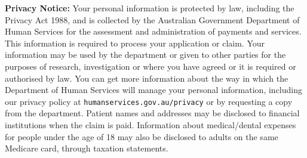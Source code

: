 \documentclass[12pt]{article}
\begin{document}
\begin{spacing}{0.3}
{{\bf Privacy Notice:} Your personal information is protected by law, including the Privacy Act 1988, and is collected by the Australian Government Department of Human Services for the assessment and administration of payments and services. This information is required to process your application or claim. 
Your information may be used by the department or given to other parties for the purposes of research, investigation or where you have agreed or it is required or authorised by law. 
You can get more information about the way in which the Department of Human Services will manage your personal information, including our privacy policy at \texttt{humanservices.gov.au/privacy} or by requesting a copy from the department.
Patient names and addresses may be disclosed to financial institutions when the claim is paid. Information about medical/dental expenses for people under the age of 18 may also be disclosed to adults on the same Medicare card, through taxation statements.}
\end{spacing}
\end{document}
